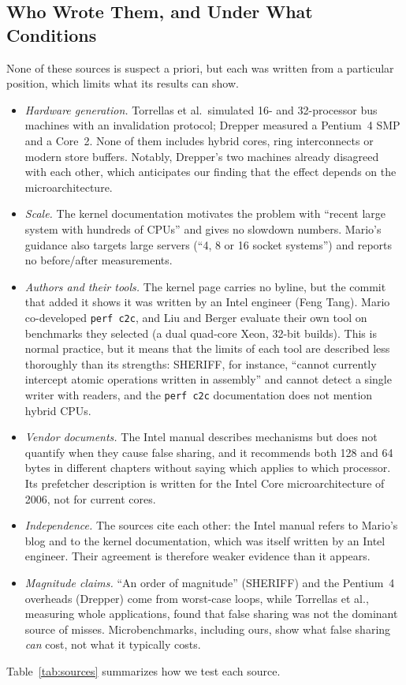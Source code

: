 \documentclass[journal]{IEEEtran}
\begin{document}
\subsection{Who Wrote Them, and Under What Conditions}
None of these sources is suspect a priori, but each was written from a
particular position, which limits what its results can show.
\begin{itemize}
  \item \emph{Hardware generation.} Torrellas et al.\ simulated 16- and
        32-processor bus machines with an invalidation protocol; Drepper
        measured a Pentium~4 SMP and a Core~2. None of them includes hybrid
        cores, ring interconnects or modern store buffers. Notably, Drepper's
        two machines already disagreed with each other, which anticipates our
        finding that the effect depends on the microarchitecture.
  \item \emph{Scale.} The kernel documentation motivates the problem with
        ``recent large system with hundreds of CPUs'' and gives no slowdown
        numbers. Mario's guidance also targets large servers (``4, 8 or 16
        socket systems'') and reports no before/after measurements.
  \item \emph{Authors and their tools.} The kernel page carries no byline, but
        the commit that added it shows it was written by an Intel engineer
        (Feng Tang). Mario co-developed \texttt{perf c2c}, and Liu and Berger
        evaluate their own tool on benchmarks they selected (a dual quad-core
        Xeon, 32-bit builds). This is normal practice, but it means that the
        limits of each tool are described less thoroughly than its strengths:
        SHERIFF, for instance, ``cannot currently intercept atomic operations
        written in assembly'' and cannot detect a single writer with readers,
        and the \texttt{perf c2c} documentation does not mention hybrid CPUs.
  \item \emph{Vendor documents.} The Intel manual describes mechanisms but does
        not quantify when they cause false sharing, and it recommends both
        128 and 64 bytes in different chapters without saying which applies
        to which processor. Its prefetcher description is written for the
        Intel Core microarchitecture of 2006, not for current cores.
  \item \emph{Independence.} The sources cite each other: the Intel manual
        refers to Mario's blog and to the kernel documentation, which was
        itself written by an Intel engineer. Their agreement is therefore
        weaker evidence than it appears.
  \item \emph{Magnitude claims.} ``An order of magnitude'' (SHERIFF) and the
        Pentium~4 overheads (Drepper) come from worst-case loops, while
        Torrellas et al., measuring whole applications, found that false
        sharing was not the dominant source of misses. Microbenchmarks,
        including ours, show what false sharing \emph{can} cost, not what it
        typically costs.
\end{itemize}
Table~\ref{tab:sources} summarizes how we test each source.
\end{document}
